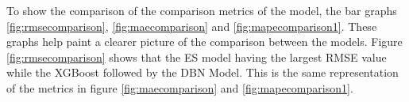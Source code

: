  
 \begin{table}[htbp]
 	\centering
 	\small
 	\caption{Performance comparison of forecasting models}
 	\label{tab:model-performance}
 	
 \end{table}
 To show the comparison of the comparison metrics of the model, the bar graphs \ref{fig:rmsecomparison}, \ref{fig:maecomparison} and \ref{fig:mapecomparison1}. These graphs help paint a clearer picture of the comparison between the models.
 Figure \ref{fig:rmsecomparison} shows that the ES model having the largest RMSE value while the XGBoost followed by the DBN Model. This is the same representation of the metrics in figure \ref{fig:maecomparison} and \ref{fig:mapecomparison1}.
 
